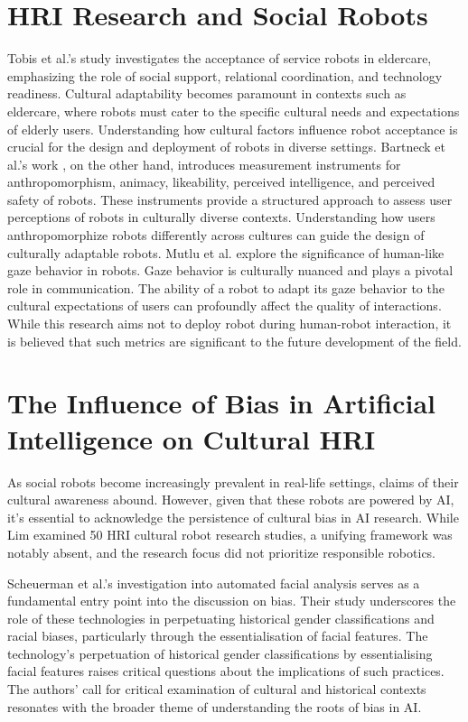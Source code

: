 \section{HRI Research and Social Robots}
Tobis et al.'s study \cite{tobis2022} investigates the acceptance of service robots in eldercare, emphasizing the role of social support, relational coordination, and technology readiness. Cultural adaptability becomes paramount in contexts such as eldercare, where robots must cater to the specific cultural needs and expectations of elderly users. Understanding how cultural factors influence robot acceptance is crucial for the design and deployment of robots in diverse settings. Bartneck et al.'s work \cite{bartneck2008}, on the other hand, introduces measurement instruments for anthropomorphism, animacy, likeability, perceived intelligence, and perceived safety of robots. These instruments provide a structured approach to assess user perceptions of robots in culturally diverse contexts. Understanding how users anthropomorphize robots differently across cultures can guide the design of culturally adaptable robots. Mutlu et al. \cite{mutlu2006} explore the significance of human-like gaze behavior in robots. Gaze behavior is culturally nuanced and plays a pivotal role in communication. The ability of a robot to adapt its gaze behavior to the cultural expectations of users can profoundly affect the quality of interactions. While this research aims not to deploy robot during human-robot interaction, it is believed that such metrics are significant to the future development of the field.

\section{The Influence of Bias in Artificial Intelligence on Cultural HRI}
As social robots become increasingly prevalent in real-life settings, claims of their cultural awareness abound. However, given that these robots are powered by AI, it's essential to acknowledge the persistence of cultural bias in AI research. While Lim \cite{lim2020} examined 50 HRI cultural robot research studies, a unifying framework was notably absent, and the research focus did not prioritize responsible robotics.

Scheuerman et al.'s \cite{scheuerman2021} investigation into automated facial analysis serves as a fundamental entry point into the discussion on bias. Their study underscores the role of these technologies in perpetuating historical gender classifications and racial biases, particularly through the essentialisation of facial features. The technology's perpetuation of historical gender classifications by essentialising facial features raises critical questions about the implications of such practices. The authors’ call for critical examination of cultural and historical contexts resonates with the broader theme of understanding the roots of bias in AI.

